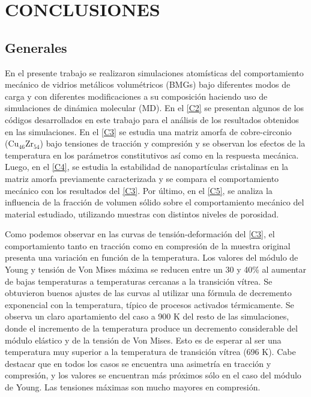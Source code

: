 
\chapter{CONCLUSIONES} %

\label{C6} %



\section{Generales}

En el presente trabajo se realizaron simulaciones atomísticas del comportamiento mecánico de vidrios metálicos volumétricos (BMGs) bajo diferentes modos de carga y con diferentes modificaciones a su composición haciendo uso de simulaciones de dinámica molecular (MD). En el \cref{C2} se presentan algunos de los códigos desarrollados en este trabajo para el análisis de los resultados obtenidos en las simulaciones. En el \cref{C3} se estudia una matriz amorfa de cobre-circonio (Cu$_{46}$Zr$_{54}$) bajo tensiones de tracción y compresión y se observan los efectos de la temperatura en los parámetros constitutivos así como en la respuesta mecánica. Luego, en el \cref{C4}, se estudia la estabilidad de nanopartículas cristalinas en la matriz amorfa previamente caracterizada y se compara el comportamiento mecánico con los resultados del \cref{C3}. Por último, en el \cref{C5}, se analiza la influencia de la fracción de volumen sólido sobre el comportamiento mecánico del material estudiado, utilizando muestras con distintos niveles de porosidad.

Como podemos observar en las curvas de tensión-deformación del \cref{C3}, el comportamiento tanto en tracción como en compresión de la muestra original presenta una variación en función de la temperatura. Los valores del módulo de Young y tensión de Von Mises máxima se reducen entre un 30 y 40\% al aumentar de bajas temperaturas a temperaturas cercanas a la transición vítrea. Se obtuvieron buenos ajustes de las curvas al utilizar una fórmula de decremento exponencial con la temperatura, típico de procesos activados térmicamente. Se observa un claro apartamiento del caso a 900 K del resto de las simulaciones, donde el incremento de la temperatura produce un decremento considerable del módulo elástico y de la tensión de Von Mises. Esto es de esperar al ser una temperatura muy superior a la temperatura de transición vítrea (696 K). Cabe destacar que en todos los casos se encuentra una asimetría en tracción y compresión, y los valores se encuentran más próximos sólo en el caso del módulo de Young. Las tensiones máximas son mucho mayores en compresión.

